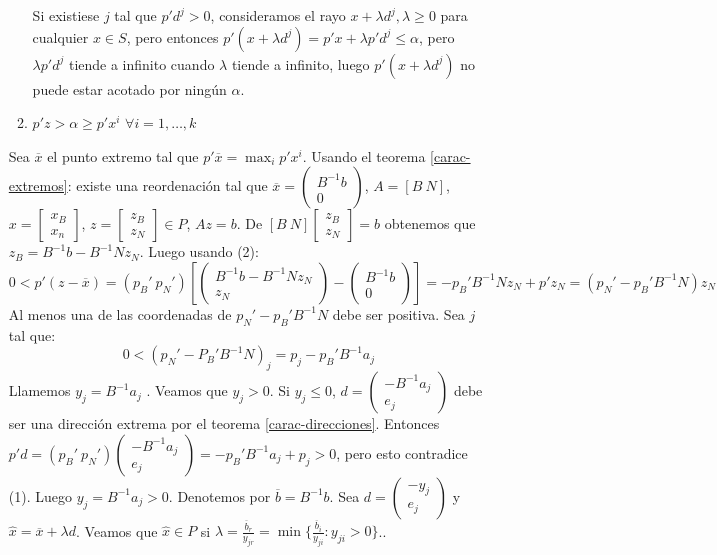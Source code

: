 \documentclass[PM.tex]{subfiles}
\begin{document}
\begin{dem}
\begin{itemize}
\begin{enumerate}
		Si existiese $j$ tal que $p'd^j > 0$, consideramos el rayo $x + λd^j, λ ≥ 0$ para cualquier $x \in S$, pero entonces $p'(x+λd^j) = p'x + λp'd^j ≤ α$, pero $λp'd^j$ tiende a infinito cuando $λ$ tiende a infinito, luego $p'(x+λd^j)$ no puede estar acotado por ningún $α$.
		\item $p'z > α ≥ p'x^i$ $\forall i=1,\dots,k$
	\end{enumerate}
	Sea $\overline{x}$ el punto extremo tal que $p'\overline{x} = \max_i p'x^i$. Usando el teorema \ref{carac-extremos}: existe una reordenación tal que $\overline{x} = \begin{pmatrix}B^{-1}b\\0\end{pmatrix}$, $A = [B\ N]$, $x = \begin{bmatrix}x_B\\x_n\end{bmatrix}$, $z = \begin{bmatrix}z_B\\z_N\end{bmatrix} \in P$, $Az=b$. De $[B\ N]\begin{bmatrix}z_B\\z_N\end{bmatrix} = b$ obtenemos que $z_B = B^{-1}b-B^{-1}Nz_N$. Luego usando (2):
	\[ 0 < p'(z-\overline{x}) = (p_B'\ p_N') \left[\begin{pmatrix}B^{-1}b-B^{-1}Nz_N\\z_N\end{pmatrix}-\begin{pmatrix}B^{-1}b\\0\end{pmatrix}\right] =-p_B'B^{-1}Nz_N + p'z_N = (p_N'-p_B'B^{-1}N)z_N \]
	Al menos una de las coordenadas de $p_N'-p_B'B^{-1}N$ debe ser positiva. Sea $j$ tal que:
	\[ 0 < (p_N'-P_B'B^{-1}N)_j = p_j - p_B'B^{-1}a_j \]
	Llamemos $y_j = B^{-1}a_j$ . Veamos que $y_j > 0$. Si $y_j ≤ 0$, $d = \begin{pmatrix}-B^{-1}a_j\\e_j\end{pmatrix}$ debe ser una dirección extrema por el teorema \ref{carac-direcciones}. Entonces $p'd = (p_B'\ p_N')\begin{pmatrix}-B^{-1}a_j\\e_j\end{pmatrix}=-p_B'B^{-1}a_j + p_j > 0$, pero esto contradice (1). Luego $y_j = B^{-1}a_j > 0$. Denotemos por $\overline{b}=B^{-1}b$. Sea $d = \begin{pmatrix}-y_j\\e_j\end{pmatrix}$ y $\hat{x} = \overline{x} + λd$. Veamos que $\hat{x} \in P$ si $λ = \frac{\overline{b}_r}{y_{jr}} = \min\{\frac{\overline{b}_i}{y_{ji}} : y_{ji} > 0\}$..

\end{itemize}
\end{dem}
\end{document}
